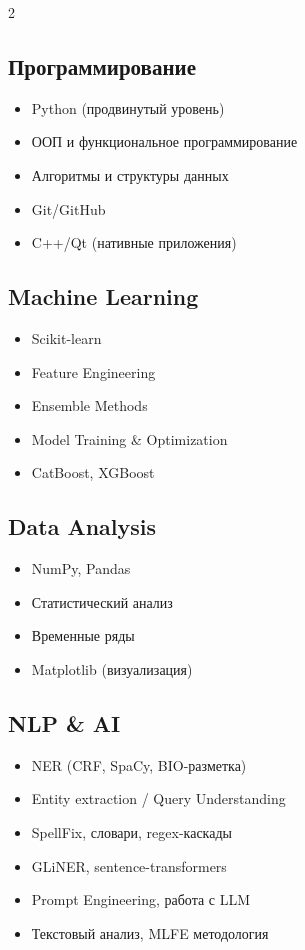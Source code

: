 \documentclass[11pt,a4paper]{article}
\begin{document}
\begin{multicols}{2}
\subsection*{Программирование}
\begin{itemize}
  \item Python (продвинутый уровень)
  \item ООП и функциональное программирование
  \item Алгоритмы и структуры данных
  \item Git/GitHub
  \item C++/Qt (нативные приложения)
\end{itemize}

\subsection*{Machine Learning}
\begin{itemize}
  \item Scikit-learn
  \item Feature Engineering
  \item Ensemble Methods
  \item Model Training \& Optimization
  \item CatBoost, XGBoost
\end{itemize}

\columnbreak

\subsection*{Data Analysis}
\begin{itemize}
  \item NumPy, Pandas
  \item Статистический анализ
  \item Временные ряды
  \item Matplotlib (визуализация)
\end{itemize}

\subsection*{NLP \& AI}
\begin{itemize}
  \item NER (CRF, SpaCy, BIO-разметка)
  \item Entity extraction / Query Understanding
  \item SpellFix, словари, regex-каскады
  \item GLiNER, sentence-transformers
  \item Prompt Engineering, работа с LLM
  \item Текстовый анализ, MLFE методология
\end{itemize}
\end{multicols}
\end{document}
